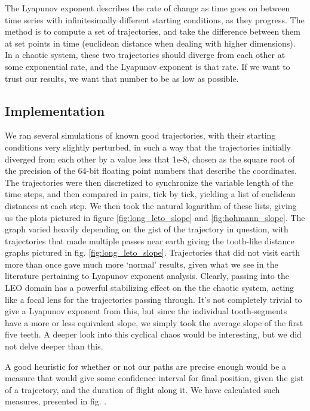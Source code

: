 The Lyapunov exponent describes the rate of change as time goes on between time series with infinitesimally different starting conditions, as they progress. The method is to compute a set of trajectories, and take the difference between them at set points in time (euclidean distance when dealing with higher dimensions). In a chaotic system, these two trajectories should diverge from each other at some exponential rate, and the Lyapunov exponent is that rate. If we want to trust our results, we want that number to be as low as possible. 

\subsection{Implementation}

We ran several simulations of known good trajectories, with their starting conditions very slightly perturbed, in such a way that the trajectories initially diverged from each other by a value less that 1e-8, chosen as the square root of the precision of the 64-bit floating point numbers that describe the coordinates. The trajectories were then discretized to synchronize the variable length of the time steps, and then compared in pairs, tick by tick, yielding a list of euclidean distances at each step. We then took the natural logarithm of these lists, giving us the plots pictured in figure \ref{fig:long_leto_slope} and \ref{fig:hohmann_slope}. The graph varied heavily depending on the gist of the trajectory in question, with trajectories that made multiple passes near earth giving the tooth-like distance graphs pictured in fig. \ref{fig:long_leto_slope}. Trajectories that did not visit earth more than once gave much more `normal' results, given what we see in the literature pertaining to Lyapunov exponent analysis. Clearly, passing into the LEO domain has a powerful stabilizing effect on the the chaotic system, acting like a focal lens for the trajectories passing through. It's not completely trivial to give a Lyapunov exponent from this, but since the individual tooth-segments have a more or less equivalent slope, we simply took the average slope of the first five teeth. A deeper look into this cyclical chaos would be interesting, but we did not delve deeper than this.

A good heuristic for whether or not our paths are precise enough would be a measure that would give some confidence interval for final position, given the gist of a trajectory, and the duration of flight along it. We have calculated such measures, presented in fig. .

